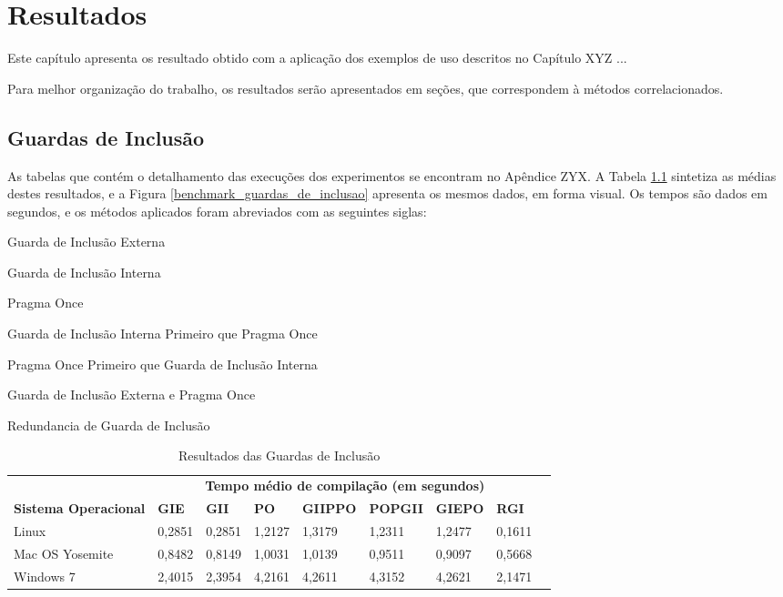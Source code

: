 \chapter[Resultados]{Resultados}

Este capítulo apresenta os resultado obtido com a aplicação dos exemplos de uso descritos no Capítulo XYZ ...

Para melhor organização do trabalho, os resultados serão apresentados em seções, que correspondem à métodos correlacionados.

\section{Guardas de Inclusão}

As tabelas que contém o detalhamento das execuções dos experimentos se encontram no Apêndice ZYX. A Tabela \ref{tab:resutados_guards_de_inclusao}
sintetiza as médias destes resultados, e a Figura \ref{benchmark_guardas_de_inclusao} apresenta os mesmos dados, em forma
visual. Os tempos são dados em segundos, e os métodos aplicados foram abreviados com as seguintes siglas:

\begin{description}
    \tiny
    \item [GIE:] Guarda de Inclusão Externa
    \item [GII:] Guarda de Inclusão Interna
    \item [PO:]  Pragma Once
    \item [GIIPPO:] Guarda de Inclusão Interna Primeiro que Pragma Once
    \item [POPGII:] Pragma Once Primeiro que Guarda de Inclusão Interna
    \item [GIEPPO:] Guarda de Inclusão Externa e Pragma Once
    \item [RGI:] Redundancia de Guarda de Inclusão
\end{description}

\begin{table}[!ht]
\centering
\caption{Resultados das Guardas de Inclusão}
\label{tab:resutados_guards_de_inclusao}
\begin{tiny}
\begin{tabular}{lp{1cm}p{1cm}p{1cm}p{1cm}p{1cm}p{1cm}p{1cm}p{1cm}}
& \multicolumn{7}{c}{\textbf{Tempo médio de compilação (em segundos)} } \\
\textbf{Sistema Operacional} & \textbf{GIE} & \textbf{GII} & \textbf{PO} &
\textbf{GIIPPO} & \textbf{POPGII} & \textbf{GIEPO} & \textbf{RGI} \\ \toprule
 Linux & 0,2851     & 0,2851  & 1,2127    & 1,3179    & 1,2311  & 1,2477     & 0,1611 \\
 Mac OS Yosemite & 0,8482 & 0,8149 & 1,0031  & 1,0139  & 0,9511  & 0,9097  & 0,5668  \\ 
 Windows 7 & 2,4015 & 2,3954 & 4,2161 & 4,2611 & 4,3152 & 4,2621  & 2,1471 \\
\bottomrule
\end{tabular}
\end{tiny}
\end{table}


